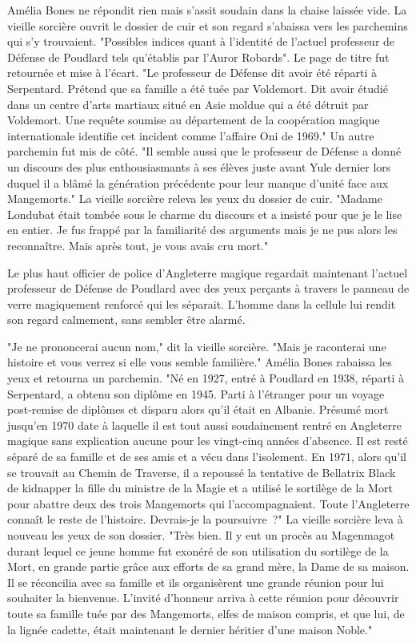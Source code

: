 Amélia Bones ne répondit rien mais s'assit soudain dans la chaise laissée vide. La vieille sorcière ouvrit le dossier de cuir et son regard s'abaissa vers les parchemins qui s'y trouvaient. "Possibles indices quant à l'identité de l'actuel professeur de Défense de Poudlard tels qu'établis par l'Auror Robards". Le page de titre fut retournée et mise à l'écart. "Le professeur de Défense dit avoir été réparti à Serpentard. Prétend que sa famille a été tuée par Voldemort. Dit avoir étudié dans un centre d'arts martiaux situé en Asie moldue qui a été détruit par Voldemort. Une requête soumise au département de la coopération magique internationale identifie cet incident comme l'affaire Oni de 1969." Un autre parchemin fut mis de côté. "Il semble aussi que le professeur de Défense a donné un discours des plus enthousiasmants à ses élèves juste avant Yule dernier lors duquel il a blâmé la génération précédente pour leur manque d'unité face aux Mangemorts." La vieille sorcière releva les yeux du dossier de cuir. "Madame Londubat était tombée sous le charme du discours et a insisté pour que je le lise en entier. Je fus frappé par la familiarité des arguments mais je ne pus alors les reconnaître. Mais après tout, je vous avais cru mort."

Le plus haut officier de police d'Angleterre magique regardait maintenant l'actuel professeur de Défense de Poudlard avec des yeux perçants à travers le panneau de verre magiquement renforcé qui les séparait. L'homme dans la cellule lui rendit son regard calmement, sans sembler être alarmé.

"Je ne prononcerai aucun nom," dit la vieille sorcière. "Mais je raconterai une histoire et vous verrez si elle vous semble familière." Amélia Bones rabaissa les yeux et retourna un parchemin. "Né en 1927, entré à Poudlard en 1938, réparti à Serpentard, a obtenu son diplôme en 1945. Parti à l'étranger pour un voyage post-remise de diplômes et disparu alors qu'il était en Albanie. Présumé mort jusqu'en 1970 date à laquelle il est tout aussi soudainement rentré en Angleterre magique sans explication aucune pour les vingt-cinq années d'absence. Il est resté séparé de sa famille et de ses amis et a vécu dans l'isolement. En 1971, alors qu'il se trouvait au Chemin de Traverse, il a repoussé la tentative de Bellatrix Black de kidnapper la fille du ministre de la Magie et a utilisé le sortilège de la Mort pour abattre deux des trois Mangemorts qui l'accompagnaient. Toute l'Angleterre connaît le reste de l'histoire. Devrais-je la poursuivre~?" La vieille sorcière leva à nouveau les yeux de son dossier. "Très bien. Il y eut un procès au Magenmagot durant lequel ce jeune homme fut exonéré de son utilisation du sortilège de la Mort, en grande partie grâce aux efforts de sa grand mère, la Dame de sa maison. Il se réconcilia avec sa famille et ils organisèrent une grande réunion pour lui souhaiter la bienvenue. L'invité d'honneur arriva à cette réunion pour découvrir toute sa famille tuée par des Mangemorts, elfes de maison compris, et que lui, de la lignée cadette, était maintenant le dernier héritier d'une maison Noble."

